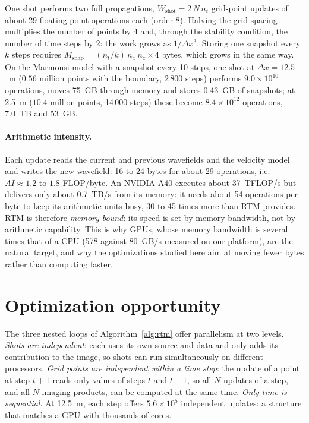\documentclass[letterpaper,11pt,leqno]{article}
\begin{document}
One shot performs two full propagations, $W_{\text{shot}} = 2\,N\,n_t$ grid-point updates of about 29 floating-point operations each (order 8). Halving the grid spacing multiplies the number of points by 4 and, through the stability condition, the number of time steps by 2: the work grows as $1/\Delta x^{3}$. Storing one snapshot every $k$ steps requires $M_{\text{snap}} = (n_t/k)\, n_x\, n_z \times 4$ bytes, which grows in the same way. On the Marmousi model with a snapshot every 10 steps, one shot at $\Delta x = 12.5$~m ($0.56$ million points with the boundary, 2\,800 steps) performs $9.0\times10^{10}$ operations, moves 75~GB through memory and stores 0.43~GB of snapshots; at 2.5~m ($10.4$ million points, 14\,000 steps) these become $8.4\times10^{12}$ operations, 7.0~TB and 53~GB.

\paragraph{Arithmetic intensity.} Each update reads the current and previous wavefields and the velocity model and writes the new wavefield: 16 to 24 bytes for about 29 operations, i.e.\ $AI \approx 1.2$ to $1.8$ FLOP/byte. An NVIDIA A40 executes about 37~TFLOP/s but delivers only about 0.7~TB/s from its memory: it needs about 54 operations per byte to keep its arithmetic units busy, 30 to 45 times more than RTM provides. RTM is therefore \emph{memory-bound}: its speed is set by memory bandwidth, not by arithmetic capability. This is why GPUs, whose memory bandwidth is several times that of a CPU (578 against 80~GB/s measured on our platform), are the natural target, and why the optimizations studied here aim at moving fewer bytes rather than computing faster.

\section{Optimization opportunity}

The three nested loops of Algorithm~\ref{alg:rtm} offer parallelism at two levels. \emph{Shots are independent}: each uses its own source and data and only adds its contribution to the image, so shots can run simultaneously on different processors. \emph{Grid points are independent within a time step}: the update of a point at step $t+1$ reads only values of steps $t$ and $t-1$, so all $N$ updates of a step, and all $N$ imaging products, can be computed at the same time. \emph{Only time is sequential}. At 12.5~m, each step offers $5.6 \times 10^{5}$ independent updates: a structure that matches a GPU with thousands of cores.
\end{document}
